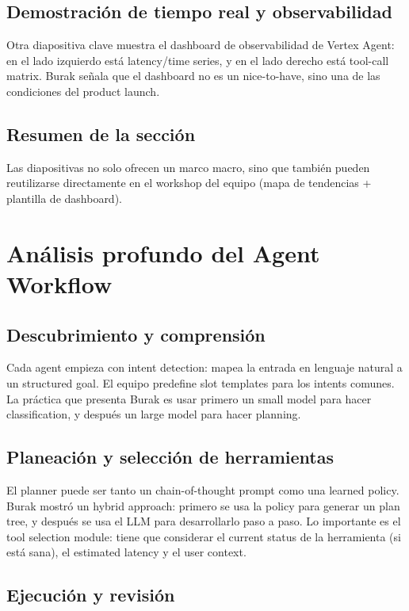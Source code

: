 \documentclass[a4paper]{article}
\begin{document}
\subsection{Demostración de tiempo real y observabilidad}

Otra diapositiva clave muestra el dashboard de observabilidad de Vertex Agent: en el lado izquierdo está latency/time series, y en el lado derecho está tool-call matrix. Burak señala que el dashboard no es un nice-to-have, sino una de las condiciones del product launch.

\subsection{Resumen de la sección}

Las diapositivas no solo ofrecen un marco macro, sino que también pueden reutilizarse directamente en el workshop del equipo (mapa de tendencias + plantilla de dashboard).

\section{Análisis profundo del Agent Workflow}

\subsection{Descubrimiento y comprensión}

Cada agent empieza con intent detection: mapea la entrada en lenguaje natural a un structured goal. El equipo predefine slot templates para los intents comunes. La práctica que presenta Burak es usar primero un small model para hacer classification, y después un large model para hacer planning.

\subsection{Planeación y selección de herramientas}

El planner puede ser tanto un chain-of-thought prompt como una learned policy. Burak mostró un hybrid approach: primero se usa la policy para generar un plan tree, y después se usa el LLM para desarrollarlo paso a paso. Lo importante es el tool selection module: tiene que considerar el current status de la herramienta (si está sana), el estimated latency y el user context.

\subsection{Ejecución y revisión}
\end{document}
